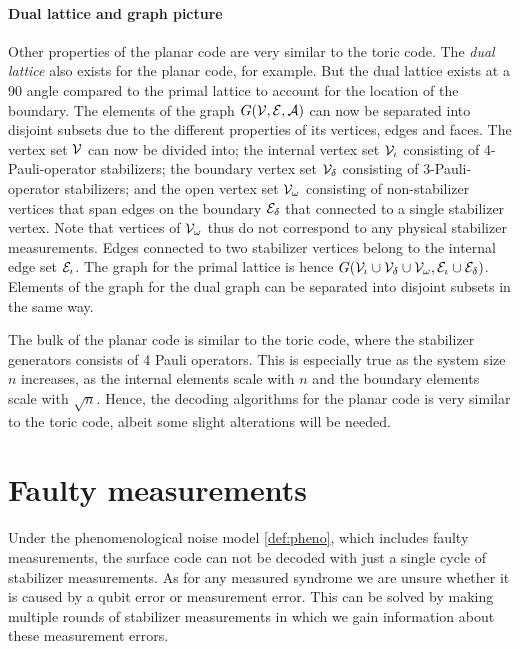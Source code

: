 \paragraph{Dual lattice and graph picture}
Other properties of the planar code are very similar to the toric code. The \emph{dual lattice} also exists for the planar code, for example. But the dual lattice exists at a 90 angle compared to the primal lattice to account for the location of the boundary. The elements of the graph $G(\mathcal{V},\mathcal{E},\mathcal{A})$ can now be separated into disjoint subsets due to the different properties of its vertices, edges and faces. The vertex set $\mathcal{V}$ can now be divided into; the internal vertex set $\mathcal{V}_\iota$ consisting of 4-Pauli-operator stabilizers; the boundary vertex set $\mathcal{V}_{\delta}$ consisting of 3-Pauli-operator stabilizers; and the open vertex set $\mathcal{V}_\omega$ consisting of non-stabilizer vertices that span edges on the boundary $\mathcal{E}_{\delta}$ that connected to a single stabilizer vertex. Note that vertices of $\mathcal{V}_\omega$ thus do not correspond to any physical stabilizer measurements. Edges connected to two stabilizer vertices belong to the internal edge set $\mathcal{E}_\iota$. The graph for the primal lattice is hence $G(\mathcal{V}_\iota\cup \mathcal{V}_\delta \cup \mathcal{V}_\omega, \mathcal{E}_\iota\cup \mathcal{E}_\delta)$. Elements of the graph for the dual graph can be separated into disjoint subsets in the same way.

\vspace{1em}
The bulk of the planar code is similar to the toric code, where the stabilizer generators consists of 4 Pauli operators. This is especially true as the system size $n$ increases, as the internal elements scale with $n$ and the boundary elements scale with $\sqrt{n}$. Hence, the decoding algorithms for the planar code is very similar to the toric code, albeit some slight alterations will be needed. 

\section{Faulty measurements}\label{sec:faultymeasurments}

Under the phenomenological noise model \ref{def:pheno}, which includes faulty measurements, the surface code can not be decoded with just a single cycle of stabilizer measurements. As for any measured syndrome we are unsure whether it is caused by a qubit error or measurement error. This can be solved by making multiple rounds of stabilizer measurements in which we gain information about these measurement errors. 

